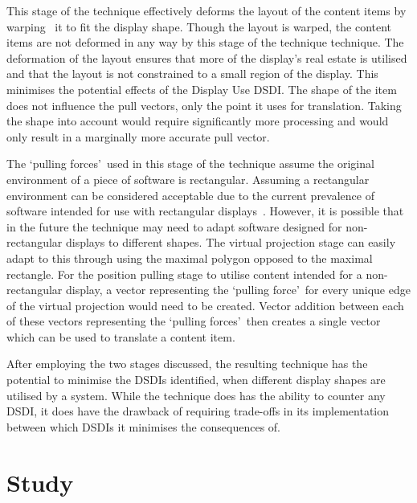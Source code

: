 \documentclass[review,5p,times,twocolumn]{elsarticle}
\begin{document}
This stage of the technique effectively deforms the layout of the content items by warping~\cite{Milliron2002} it to fit the display shape.
Though the layout is warped, the content items are not deformed in any way by this stage of the technique technique.
The deformation of the layout ensures that more of the display's real estate is utilised and that the layout is not constrained to a small region of the display.
This minimises the potential effects of the Display Use \ac{DSDI}.
The shape of the item does not influence the pull vectors, only the point it uses for translation.
Taking the shape into account would require significantly more processing and would only result in a marginally more accurate pull vector.

The \lq pulling forces\rq\ used in this stage of the technique assume the original environment of a piece of software is rectangular.
Assuming a rectangular environment can be considered acceptable due to the current prevalence of software intended for use with rectangular displays~\cite{VanDam2001}.
However, it is possible that in the future the technique may need to adapt software designed for non-rectangular displays to different shapes.
The virtual projection stage can easily adapt to this through using the maximal polygon opposed to the maximal rectangle.
For the position pulling stage to utilise content intended for a non-rectangular display, a vector representing the \lq pulling force\rq\ for every unique edge of the virtual projection would need to be created.
Vector addition between each of these vectors representing the \lq pulling forces\rq\ then creates a single vector which can be used to translate a content item.

After employing the two stages discussed, the resulting technique has the potential to minimise the \acp{DSDI} identified, when different display shapes are utilised by a system. 
While the technique does has the ability to counter any \ac{DSDI}, it does have the drawback of requiring trade-offs in its implementation between which \acp{DSDI} it minimises the consequences of.

\section{Study}
\label{sec:study}
\end{document}
